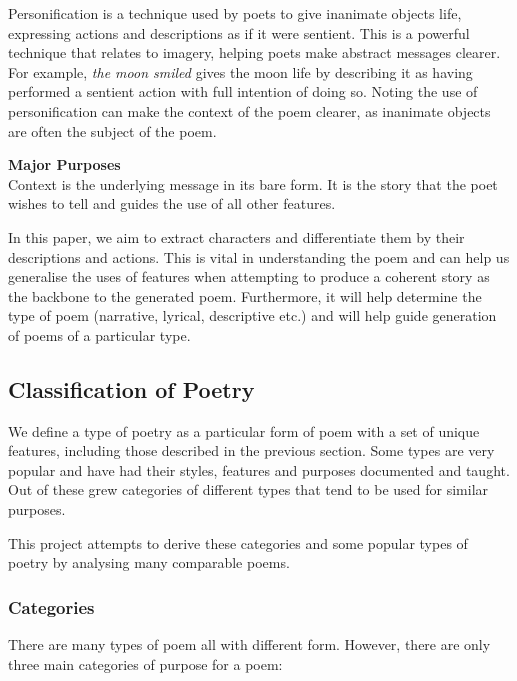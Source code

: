 Personification is a technique used by poets to give inanimate objects life, expressing actions and descriptions as if it were sentient. This is a powerful technique that relates to imagery, helping poets make abstract messages clearer. For example, \textit{the moon smiled} gives the moon life by describing it as having performed a sentient action with full intention of doing so. Noting the use of personification can make the context of the poem clearer, as inanimate objects are often the subject of the poem.

\textbf{Major Purposes}\\
Context is the underlying message in its bare form. It is the story that the poet wishes to tell and guides the use of all other features.

In this paper, we aim to extract characters and differentiate them by their descriptions and actions. This is vital in understanding the poem and can help us generalise the uses of features when attempting to produce a coherent story as the backbone to the generated poem. Furthermore, it will help determine the type of poem (narrative, lyrical, descriptive etc.) and will help guide generation of poems of a particular type. 


\subsection{Classification of Poetry}

We define a type of poetry as a particular form of poem with a set of unique features, including those described in the previous section. Some types are very popular and have had their styles, features and purposes documented and taught. Out of these grew categories of different types that tend to be used for similar purposes.

This project attempts to derive these categories and some popular types of poetry by analysing many comparable poems.

\subsubsection{Categories}

There are many types of poem all with different form. However, there are only three main categories of purpose for a poem:

